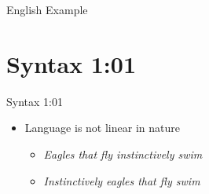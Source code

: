 \documentclass[10pt]{beamer}
\begin{document}
\begin{frame}[fragile]{English Example}
  


\end{frame}

\section*{Syntax 1:01}

\begin{frame}[fragile]{Syntax 1:01}
  \begin{itemize}
    \item Language is not linear in nature \pause
    \begin{itemize}[<+->]
      \item \emph{Eagles that fly instinctively swim}
      \item \emph{Instinctively eagles that fly swim}
    \end{itemize}
  \end{itemize}
\end{frame}
\end{document}
